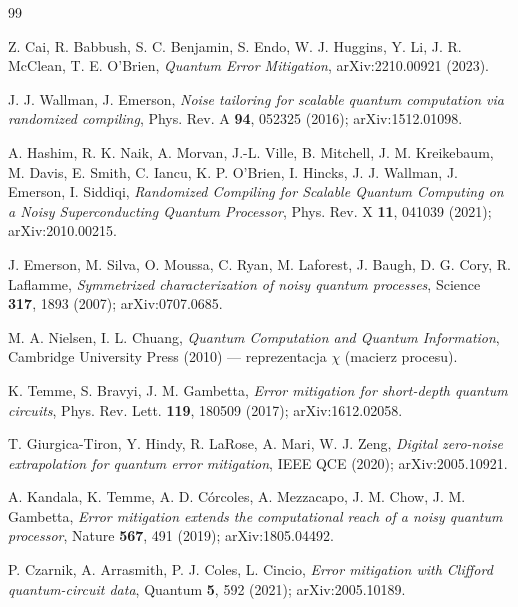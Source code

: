 \documentclass[11pt,a4paper]{article}
\begin{document}
\begin{thebibliography}{99}

Z. Cai, R. Babbush, S. C. Benjamin, S. Endo, W. J. Huggins, Y. Li, J. R. McClean,
T. E. O'Brien, \emph{Quantum Error Mitigation}, arXiv:2210.00921 (2023).

J. J. Wallman, J. Emerson, \emph{Noise tailoring for scalable quantum computation
via randomized compiling}, Phys. Rev. A \textbf{94}, 052325 (2016); arXiv:1512.01098.

A. Hashim, R. K. Naik, A. Morvan, J.-L. Ville, B. Mitchell, J. M. Kreikebaum, M. Davis,
E. Smith, C. Iancu, K. P. O'Brien, I. Hincks, J. J. Wallman, J. Emerson, I. Siddiqi,
\emph{Randomized Compiling for Scalable Quantum Computing on a Noisy Superconducting
Quantum Processor}, Phys. Rev. X \textbf{11}, 041039 (2021); arXiv:2010.00215.

J. Emerson, M. Silva, O. Moussa, C. Ryan, M. Laforest, J. Baugh, D. G. Cory,
R. Laflamme, \emph{Symmetrized characterization of noisy quantum processes},
Science \textbf{317}, 1893 (2007); arXiv:0707.0685.

M. A. Nielsen, I. L. Chuang, \emph{Quantum Computation and Quantum Information},
Cambridge University Press (2010) --- reprezentacja $\chi$ (macierz procesu).

K. Temme, S. Bravyi, J. M. Gambetta, \emph{Error mitigation for short-depth quantum
circuits}, Phys. Rev. Lett. \textbf{119}, 180509 (2017); arXiv:1612.02058.

T. Giurgica-Tiron, Y. Hindy, R. LaRose, A. Mari, W. J. Zeng, \emph{Digital zero-noise
extrapolation for quantum error mitigation}, IEEE QCE (2020); arXiv:2005.10921.

A. Kandala, K. Temme, A. D. Córcoles, A. Mezzacapo, J. M. Chow, J. M. Gambetta,
\emph{Error mitigation extends the computational reach of a noisy quantum processor},
Nature \textbf{567}, 491 (2019); arXiv:1805.04492.

P. Czarnik, A. Arrasmith, P. J. Coles, L. Cincio, \emph{Error mitigation with Clifford
quantum-circuit data}, Quantum \textbf{5}, 592 (2021); arXiv:2005.10189.


\end{thebibliography}
\end{document}
